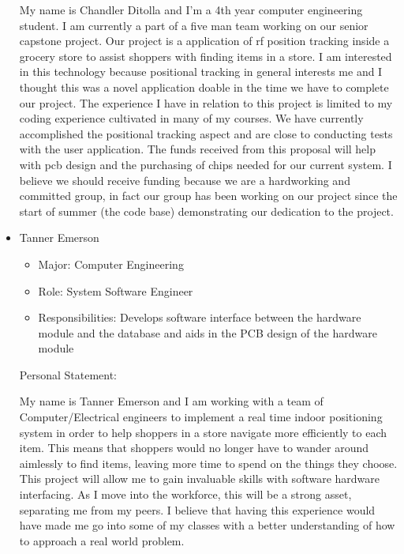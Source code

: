 \documentclass{article}
\begin{document}
\begin{itemize}
My name is Chandler Ditolla and I'm a 4th year computer engineering student. I am currently a part of a five man team working on our senior capstone project. Our project is a application of rf position tracking inside a grocery store to assist shoppers with finding items in a store. I am interested in this technology because positional tracking in general interests me and I thought this was a novel application doable in the time we have to complete our project. The experience I have in relation to this project is limited to my coding experience cultivated in many of my courses. We have currently accomplished the positional tracking aspect and are close to conducting tests with the user application. The funds received from this proposal will help with pcb design and the purchasing of chips needed for our current system. I believe we should receive funding because we are a hardworking and committed group, in fact our group has been working on our project since the start of summer (the code base) demonstrating our dedication to the project.
\item Tanner Emerson
	\begin{itemize}
	\item Major: Computer Engineering
	\item Role: System Software Engineer
	\item Responsibilities: Develops software interface between the hardware module and the database and aids in the PCB design of the hardware module
	\end{itemize}
Personal Statement:

My name is Tanner Emerson and I am working with a team of Computer/Electrical engineers to implement a real time indoor positioning system in order to help shoppers in a store navigate more efficiently to each item. This means that shoppers would no longer have to wander around aimlessly to find items, leaving more time to spend on the things they choose. This project will allow me to gain invaluable skills with software hardware interfacing. As I move into the workforce, this will be a strong asset, separating me from my peers. I believe that having this experience would have made me go into some of my classes with a better understanding of how to approach a real world problem. 


\end{itemize}
\end{document}
